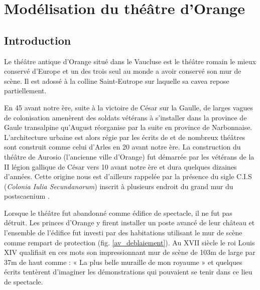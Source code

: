 \part{Modélisation du théâtre d’Orange}

	\chapter*{Introduction}
	
			 Le théâtre antique d'Orange situé dans le Vaucluse est le théâtre romain le mieux conservé d'Europe et un des trois seul au monde a avoir conservé son mur de scène. Il est adossé à la colline Saint-Eutrope sur laquelle sa \gls{cavea} repose partiellement.
			 
			 En 45 avant notre ère, suite à la victoire de César sur la Gaulle, de larges vagues de colonisation amenèrent des soldats vétérans à s'installer dans la province de Gaule transalpine qu'August réorganise par la suite en province de Narbonnaise. L'architecture urbaine est alors régie par les écrits de \cite{vitruve} et de nombreux théâtres sont construit comme celui d'Arles en 20 avant notre ère. La construction du théâtre de Aurosio (l'ancienne ville d'Orange) fut démarrée par les vétérans de la II légion gallique de César vers 10 avant notre ère et dura quelques dizaines d'années. \citep{PouvoirDuTheatre} Cette origine nous est d'ailleurs rappelée par la présence du sigle C.I.S (\textit{Colonia Iulia Secundanorum}) inscrit à plusieurs endroit du grand mur du \gls{postscaenium} \cite{formige}. 
			 
			 Lorsque le théâtre fut abandonné comme édifice de spectacle, il ne fut pas détruit. Les princes d'Orange y firent installer un poste avancé de leur château et l’ensemble de l’édifice fut investi par des habitations utilisant le mur de scène comme rempart de protection (fig. \ref{av_deblaiement}). Au XVII siècle le roi Louis XIV qualifiait en ces mots son impressionnant mur de scène de 103m de large par 37m de haut comme : « La plus belle muraille de mon royaume » et quelques écrits tentèrent d'imaginer les démonstrations qui pouvaient se tenir dans ce lieu de spectacle. 
			 
